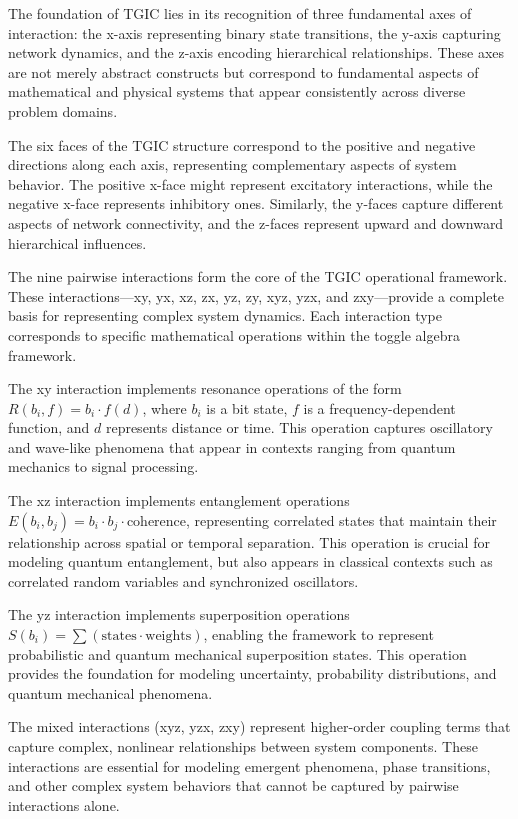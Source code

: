 \documentclass[11pt]{amsart}
\begin{document}
The foundation of TGIC lies in its recognition of three fundamental axes of interaction: the x-axis representing binary state transitions, the y-axis capturing network dynamics, and the z-axis encoding hierarchical relationships. These axes are not merely abstract constructs but correspond to fundamental aspects of mathematical and physical systems that appear consistently across diverse problem domains.

The six faces of the TGIC structure correspond to the positive and negative directions along each axis, representing complementary aspects of system behavior. The positive x-face might represent excitatory interactions, while the negative x-face represents inhibitory ones. Similarly, the y-faces capture different aspects of network connectivity, and the z-faces represent upward and downward hierarchical influences.

The nine pairwise interactions form the core of the TGIC operational framework. These interactions—xy, yx, xz, zx, yz, zy, xyz, yzx, and zxy—provide a complete basis for representing complex system dynamics. Each interaction type corresponds to specific mathematical operations within the toggle algebra framework.

The xy interaction implements resonance operations of the form $R(b_i, f) = b_i \cdot f(d)$, where $b_i$ is a bit state, $f$ is a frequency-dependent function, and $d$ represents distance or time. This operation captures oscillatory and wave-like phenomena that appear in contexts ranging from quantum mechanics to signal processing.

The xz interaction implements entanglement operations $E(b_i, b_j) = b_i \cdot b_j \cdot \text{coherence}$, representing correlated states that maintain their relationship across spatial or temporal separation. This operation is crucial for modeling quantum entanglement, but also appears in classical contexts such as correlated random variables and synchronized oscillators.

The yz interaction implements superposition operations $S(b_i) = \sum(\text{states} \cdot \text{weights})$, enabling the framework to represent probabilistic and quantum mechanical superposition states. This operation provides the foundation for modeling uncertainty, probability distributions, and quantum mechanical phenomena.

The mixed interactions (xyz, yzx, zxy) represent higher-order coupling terms that capture complex, nonlinear relationships between system components. These interactions are essential for modeling emergent phenomena, phase transitions, and other complex system behaviors that cannot be captured by pairwise interactions alone.
\end{document}
